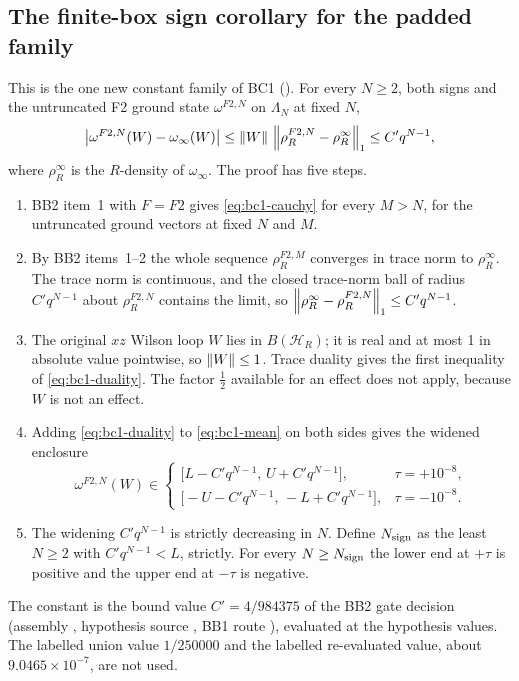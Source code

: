 \subsection{The finite-box sign corollary for the padded family}
\label{sec:bc1-sign}
This is the one new constant family of BC1 (). For
every $N\ge2$, both signs and the untruncated F2 ground state
$\omega^{F2,N}$ on $\Lambda_N$ at fixed $N$,
\begin{equation}
 \bigl|\omega^{F2,N}(W)-\omega_\infty(W)\bigr|
 \le\left\lVert W\right\rVert\,\left\lVert\rho^{F2,N}_R-\rho^{\infty}_R\right\rVert_1\le C'q^{N-1},
 \label{eq:bc1-duality}
\end{equation}
where $\rho^\infty_R$ is the $R$-density of $\omega_\infty$. The proof has
five steps.
\begin{enumerate}[label=(\roman*)]
\item BB2 item~1 with $F=F2$ gives \eqref{eq:bc1-cauchy} for every $M>N$,
 for the untruncated ground vectors at fixed $N$ and $M$.
\item By BB2 items~1--2 the whole sequence $\rho^{F2,M}_R$ converges in trace
 norm to $\rho^\infty_R$. The trace norm is continuous, and the closed
 trace-norm ball of radius $C'q^{N-1}$ about $\rho^{F2,N}_R$ contains the
 limit, so $\left\lVert\rho^\infty_R-\rho^{F2,N}_R\right\rVert_1\le C'q^{N-1}$.
\item The original $xz$ Wilson loop $W$ lies in $B(\mathcal H_R)$; it is real
 and at most 1 in absolute value pointwise, so $\left\lVert W\right\rVert\le1$. Trace duality
 gives the first inequality of \eqref{eq:bc1-duality}. The factor $\tfrac12$ available for an
 effect does not apply, because $W$ is not an effect.
\item Adding \eqref{eq:bc1-duality} to \eqref{eq:bc1-mean} on both sides
 gives the widened enclosure
 \begin{equation}
 \omega^{F2,N}(W)\in
 \begin{cases}
 \bigl[L-C'q^{N-1},\,U+C'q^{N-1}\bigr], & \tau=+10^{-8},\\
 \bigl[-U-C'q^{N-1},\,-L+C'q^{N-1}\bigr], & \tau=-10^{-8}.
 \end{cases}
 \label{eq:bc1-widened}
 \end{equation}
\item The widening $C'q^{N-1}$ is strictly decreasing in $N$. Define
 $N_{\rm sign}$ as the least $N\ge2$ with $C'q^{N-1}<L$, strictly. For every
 $N\ge N_{\rm sign}$ the lower end at $+\tau$ is positive and the upper end at
 $-\tau$ is negative.
\end{enumerate}
The constant is the bound value $C'=4/984375$ of the BB2 gate decision
(assembly , hypothesis source
, BB1 route ), evaluated at the
hypothesis values. The labelled union value $1/250000$ and the labelled
re-evaluated value, about $9.0465\times10^{-7}$, are not used.

